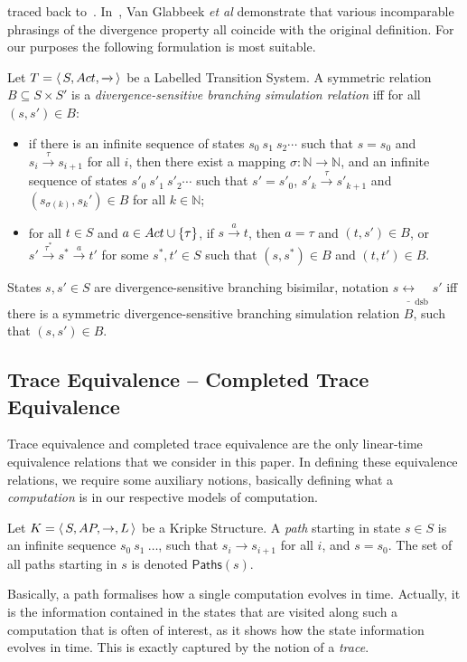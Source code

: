 \documentclass{llncs}
\newcommand{\ltstrans}[1]{\xrightarrow{#1}}
\newcommand{\kstrans}{\to}
\newcommand{\dsbbisim}{\mbox{$\underline{\leftrightarrow}_{\mathrm{dsb}}$}}
\newcommand{\etal}{\emph{et al}\xspace}
\begin{document}
traced back to~\cite{vanGlabbeek96}.
In~\cite{DBLP:journals/fuin/GlabbeekLT09}, Van Glabbeek
\etal demonstrate that various incomparable phrasings of
the divergence property all coincide with the original definition.
For our purposes the following formulation is most suitable.
\newcommand{\nat}{\ensuremath{\mathbb{N}}}
\begin{definition}
Let $T = \tuple{S, \act, \ltstrans{}}$ be a Labelled Transition System.
A symmetric relation $B \subseteq S \times S'$ is a \emph{divergence-sensitive
branching simulation relation} iff for all $(s,s') \in B$:
\begin{itemize}

\item if there is an infinite sequence of states $s_0\ s_1\ s_2 \cdots$
such that $s = s_0$ and $s_i \ltstrans{\tau} s_{i+1}$ for all $i$, then
there exist a mapping $\sigma : \nat \to \nat$, and an infinite sequence of
states $s'_0\ s'_1\ s'_2 \cdots$ such that $s' = s'_0$, $s'_k \ltstrans{\tau}
s'_{k+1}$ and $(s_{\sigma(k)}, s_k') \in B$ for all $k \in \nat$;

\item for all $t \in S$ and $a \in Act \cup \{\tau\}$, if
$s \ltstrans{a} t$, then $a=\tau$ and $(t,s') \in B$, or
$s' \ltstrans{\tau^*} s^* \ltstrans{a} t'$ for some $s^*, t' \in S$
such that $(s,s^*) \in B$ and  $(t,t') \in B$.

\end{itemize}
States $s, s' \in S$ are divergence-sensitive branching bisimilar,
notation $s \dsbbisim s'$ iff there is a symmetric divergence-sensitive
branching simulation relation $B$, such that $(s,s') \in B$.
\end{definition}



\subsection{Trace Equivalence -- Completed Trace Equivalence}
\label{sec:traces}

Trace equivalence and completed trace equivalence are the only
linear-time equivalence relations that we consider in this paper. In
defining these equivalence relations, we require some auxiliary notions,
basically defining what a \emph{computation} is in our respective
models of computation.

\newcommand{\paths}[1]{\ensuremath{\mathsf{Paths}(#1)}}
\begin{definition} Let $K = \tuple{S, \AP, \kstrans, L}$ be a Kripke
Structure. A \emph{path} starting in state $s \in S$ is an infinite
sequence $s_0\ s_1\ \ldots$, such that $s_i \kstrans{} s_{i+1}$ for
all $i$, and $s = s_0$. The set of all paths starting in $s$ is denoted
$\paths{s}$.
\end{definition}
Basically, a path formalises how a single computation evolves in
time. Actually, it is the information contained in the states that are
visited along such a computation that is often of interest, as it shows
how the state information evolves in time. This is exactly captured
by the notion of a \emph{trace}.
\end{document}
